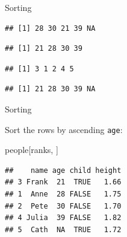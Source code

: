 \documentclass[ignorenonframetext,]{beamer}
\newenvironment{Shaded}{\begin{snugshade}}{\end{snugshade}}
\newcommand{\KeywordTok}[1]{\textcolor[rgb]{0.13,0.29,0.53}{\textbf{#1}}}
\newcommand{\NormalTok}[1]{#1}
\newcommand{\OperatorTok}[1]{\textcolor[rgb]{0.81,0.36,0.00}{\textbf{#1}}}
\newcommand{\StringTok}[1]{\textcolor[rgb]{0.31,0.60,0.02}{#1}}
\begin{document}
\begin{frame}[fragile]{Sorting}
\protect\hypertarget{sorting}{}

\begin{Shaded}
\end{Shaded}

\begin{verbatim}
## [1] 28 30 21 39 NA
\end{verbatim}

\begin{Shaded}
\end{Shaded}

\begin{verbatim}
## [1] 21 28 30 39
\end{verbatim}

\begin{Shaded}
\end{Shaded}

\begin{verbatim}
## [1] 3 1 2 4 5
\end{verbatim}

\begin{Shaded}
\end{Shaded}

\begin{verbatim}
## [1] 21 28 30 39 NA
\end{verbatim}

\end{frame}

\begin{frame}[fragile]{Sorting}
\protect\hypertarget{sorting-1}{}

Sort the rows by ascending \texttt{age}:

\begin{Shaded}
\begin{Highlighting}[]
\NormalTok{people[ranks, ]}
\end{Highlighting}
\end{Shaded}

\begin{verbatim}
##    name age child height
## 3 Frank  21  TRUE   1.66
## 1  Anne  28 FALSE   1.75
## 2  Pete  30 FALSE   1.70
## 4 Julia  39 FALSE   1.82
## 5  Cath  NA  TRUE   1.72
\end{verbatim}

\end{frame}
\end{document}
